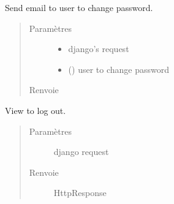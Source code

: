 \documentclass[letterpaper,10pt,french]{sphinxmanual}
\begin{document}

\begin{fulllineitems}
\label{\detokenize{accounts:accounts.views.send_reset}}
Send email to user to change password.
\begin{quote}\begin{description}
\item[{Paramètres}] \leavevmode\begin{itemize}
\item {}
 \textendash{} django’s request

\item {}
 () \textendash{} user to change password

\end{itemize}

\item[{Renvoie}] \leavevmode


\end{description}\end{quote}

\end{fulllineitems}


\begin{fulllineitems}
\label{\detokenize{accounts:accounts.views.sign_out}}
View to log out.
\begin{quote}\begin{description}
\item[{Paramètres}] \leavevmode
{} \textendash{} django request

\item[{Renvoie}] \leavevmode
HttpResponse

\end{description}\end{quote}

\end{fulllineitems}
\end{document}
